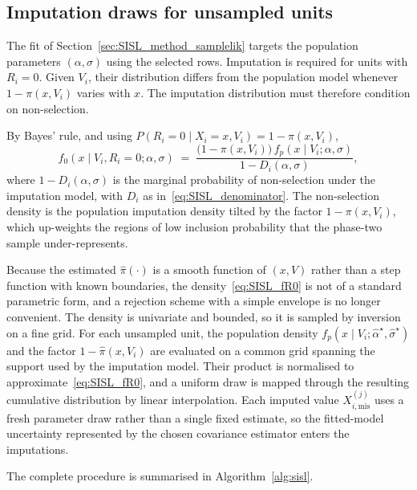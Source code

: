  
\subsection{Imputation draws for unsampled units}
\label{sec:SISL_method_imputation}
 
The fit of Section~\ref{sec:SISL_method_samplelik} targets the population parameters $(\alpha,\sigma)$ using the selected rows. Imputation is required for units with $R_i=0$. Given $V_i$, their distribution differs from the population model whenever $1-\pi(x,V_i)$ varies with $x$. The imputation distribution must therefore condition on non-selection.
 
By Bayes' rule, and using $P(R_i = 0 \mid X_i = x, V_i) = 1 - \pi(x, V_i)$,
\begin{equation}
f_0(x \mid V_i, R_i = 0;\alpha,\sigma)
\;=\;
\frac{\bigl(1 - \pi(x, V_i)\bigr)\, f_p(x \mid V_i;\alpha,\sigma)}
{1 - D_i(\alpha,\sigma)},
\label{eq:SISL_fR0}
\end{equation}
where $1 - D_i(\alpha,\sigma)$ is the marginal probability of non-selection under the imputation model, with $D_i$ as in~\eqref{eq:SISL_denominator}. The non-selection density is the population imputation density tilted by the factor $1 - \pi(x, V_i)$, which up-weights the regions of low inclusion probability that the phase-two sample under-represents.
 
Because the estimated $\hat{\pi}(\cdot)$ is a smooth function of $(x, V)$ rather than a step function with known boundaries, the density~\eqref{eq:SISL_fR0} is not of a standard parametric form, and a rejection scheme with a simple envelope is no longer convenient. The density is univariate and bounded, so it is sampled by inversion on a fine grid. For each unsampled unit, the population density $f_p(x \mid V_i;\hat{\alpha}^{\star},\hat{\sigma}^{\star})$ and the factor $1 - \hat{\pi}(x, V_i)$ are evaluated on a common grid spanning the support used by the imputation model. Their product is normalised to approximate~\eqref{eq:SISL_fR0}, and a uniform draw is mapped through the resulting cumulative distribution by linear interpolation. Each imputed value $X_{i,\mathrm{mis}}^{(j)}$ uses a fresh parameter draw rather than a single fixed estimate, so the fitted-model uncertainty represented by the chosen covariance estimator enters the imputations.
 
The complete procedure is summarised in Algorithm~\ref{alg:sisl}.
 
